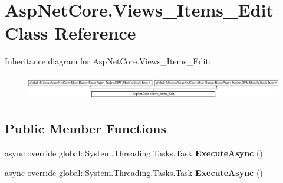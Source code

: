 \hypertarget{class_asp_net_core_1_1_views___items___edit}{}\section{Asp\+Net\+Core.\+Views\+\_\+\+Items\+\_\+\+Edit Class Reference}
\label{class_asp_net_core_1_1_views___items___edit}
Inheritance diagram for Asp\+Net\+Core.\+Views\+\_\+\+Items\+\_\+\+Edit\+:\begin{figure}[H]
\begin{center}
\leavevmode
\includegraphics[height=1.083172cm]{class_asp_net_core_1_1_views___items___edit}
\end{center}
\end{figure}
\subsection*{Public Member Functions}
\begin{DoxyCompactItemize}
\item 
\mbox{\label{class_asp_net_core_1_1_views___items___edit_a56a9c8033e4dda10ce52bd394e8288f3}} 
async override global\+::\+System.\+Threading.\+Tasks.\+Task {\bfseries Execute\+Async} ()
\item 
\mbox{\label{class_asp_net_core_1_1_views___items___edit_a56a9c8033e4dda10ce52bd394e8288f3}} 
async override global\+::\+System.\+Threading.\+Tasks.\+Task {\bfseries Execute\+Async} ()
\end{DoxyCompactItemize}
